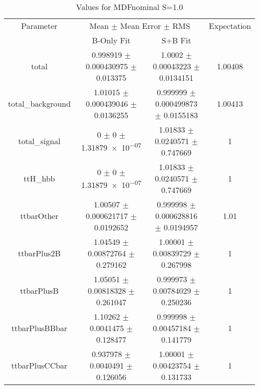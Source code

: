 \begin{table}
\centering
\caption{Values for MDFnominal S=1.0}
\begin{tabular}{cccc}
\toprule
Parameter & \multicolumn{2}{c}{Mean $\pm$ Mean Error $\pm$ RMS} & Expectation\\
 & B-Only Fit & S+B Fit & \\
\midrule
total & \num{0.998919} $\pm$ \num{0.000430975} $\pm$ \num{0.013375} & \num{1.0002} $\pm$ \num{0.00043223} $\pm$ \num{0.0134151} & \num{1.00408}\\
total\_background & \num{1.01015} $\pm$ \num{0.000439046} $\pm$ \num{0.0136255} & \num{0.999999} $\pm$ \num{0.000499873} $\pm$ \num{0.0155183} & \num{1.00413}\\
total\_signal & \num{0} $\pm$ \num{0} $\pm$ \num{1.31879e-07} & \num{1.01833} $\pm$ \num{0.0240571} $\pm$ \num{0.747669} & \num{1}\\
ttH\_hbb & \num{0} $\pm$ \num{0} $\pm$ \num{1.31879e-07} & \num{1.01833} $\pm$ \num{0.0240571} $\pm$ \num{0.747669} & \num{1}\\
ttbarOther & \num{1.00507} $\pm$ \num{0.000621717} $\pm$ \num{0.0192652} & \num{0.999998} $\pm$ \num{0.000628816} $\pm$ \num{0.0194957} & \num{1.01}\\
ttbarPlus2B & \num{1.04549} $\pm$ \num{0.00872764} $\pm$ \num{0.279162} & \num{1.00001} $\pm$ \num{0.00839729} $\pm$ \num{0.267998} & \num{1}\\
ttbarPlusB & \num{1.05051} $\pm$ \num{0.00818328} $\pm$ \num{0.261047} & \num{0.999973} $\pm$ \num{0.00784029} $\pm$ \num{0.250236} & \num{1}\\
ttbarPlusBBbar & \num{1.10262} $\pm$ \num{0.0041475} $\pm$ \num{0.128477} & \num{0.999998} $\pm$ \num{0.00457184} $\pm$ \num{0.141779} & \num{1}\\
ttbarPlusCCbar & \num{0.937978} $\pm$ \num{0.0040491} $\pm$ \num{0.126056} & \num{1.00001} $\pm$ \num{0.00423754} $\pm$ \num{0.131733} & \num{1}\\
\bottomrule
\end{tabular}
\end{table}